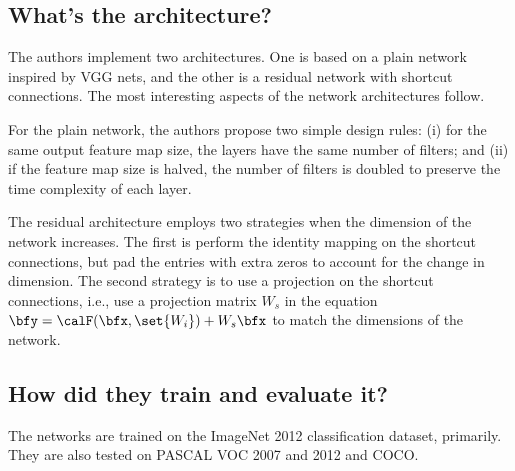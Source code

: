 
\subsection*{What's the architecture?}
The authors implement two architectures. One is based on a plain network
inspired by VGG nets, and the other is a residual network with shortcut
connections. The most interesting aspects of the network architectures follow.

For the plain network, the authors propose two simple design rules: (i) for the
same output feature map size, the layers have the same number of filters; and
(ii) if the feature map size is halved, the number of filters is doubled to
preserve the time complexity of each layer.

The residual architecture employs two strategies when the dimension of the
network increases. The first is perform the identity mapping on the shortcut
connections, but pad the entries with extra zeros to account for the change in
dimension. The second strategy is to use a projection on the shortcut
connections, i.e., use a projection matrix $W_s$ in the equation
$\bfy=\calF(\bfx,\set{W_i})+W_s\bfx$ to match the dimensions of the network.

\subsection*{How did they train and evaluate it?}
The networks are trained on the ImageNet 2012 classification dataset, primarily.
They are also tested on PASCAL VOC 2007 and 2012 and COCO.




